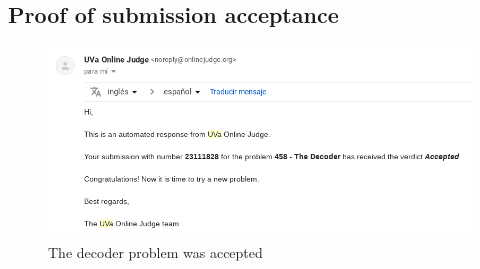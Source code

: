 \subsection{Proof of submission acceptance}
\begin{figure}[h]
    \includegraphics[scale=0.50]{sections/2competitive_programming/figures/thedecoder.png}
    \caption{The decoder problem was accepted}
    \centering
\end{figure}